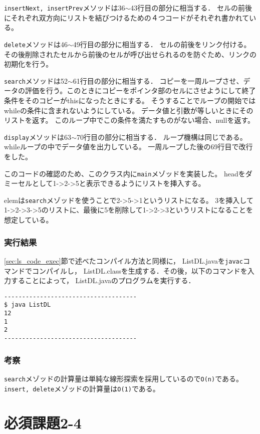 \documentclass[10.5pt,a4paper]{jsarticle}
\newcommand{\secref}[1]{\ref{#1}節}
\begin{document}
\texttt{insertNext, insertPrev}メソッドは36$\sim$43行目の部分に相当する．
セルの前後にそれぞれ双方向にリストを結びつけるための４つコードがそれぞれ書かれている。

\texttt{delete}メソッドは46$\sim$49行目の部分に相当する．
セルの前後をリンク付ける。その後削除されたセルから前後のセルが呼び出せられるのを防ぐため、リンクの初期化を行う。

\texttt{search}メソッドは52$\sim$61行目の部分に相当する．
コピーを一周ループさせ、データの評価を行う。このときにコピーをポインタ部のセルにさせようにして終了条件をそのコピーがthisになったときにする。
そうすることでループの開始ではwhileの条件に含まれないようにしている。
データ値と引数が等しいときにそのリストを返す。
このループ中でこの条件を満たすものがない場合、nullを返す。

\texttt{display}メソッドは63$\sim$70行目の部分に相当する．
ループ機構は同じである。whileループの中でデータ値を出力している。
一周ループした後の69行目で改行をした。

このコードの確認のため、このクラス内に\texttt{main}メゾッドを実装した。
headをダミーセルとして1->2->5と表示できるようにリストを挿入する。

elemは\texttt{search}メゾッドを使うことで2->5->1というリストになる。
3を挿入して1->2->3->5のリストに、最後に5を削除して1->2->3というリストになることを想定している。

\subsubsection{実行結果}

\secref{sec:ls_code_exec}で述べたコンパイル方法と同様に，
ListDL.javaを\texttt{javac}コマンドでコンパイルし，
ListDL.classを生成する．その後，以下のコマンドを入力することによって，
ListDL.javaのプログラムを実行する．

\begin{verbatim}
-------------------------------------
$ java ListDL
12
1
2
-------------------------------------
\end{verbatim}
\subsubsection{考察}
\texttt{search}メゾッドの計算量は単純な線形探索を採用しているので\texttt{O(n)}である。
\texttt{insert, delete}メゾッドの計算量は\texttt{O(1)}である。

\section{必須課題2-4}
\end{document}

